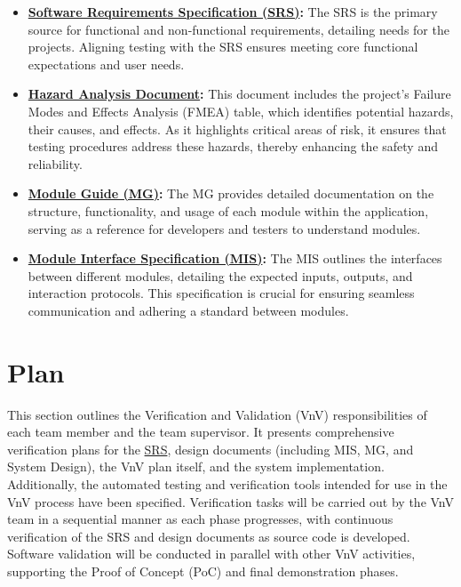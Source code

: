 \documentclass[12pt, titlepage]{article}
\begin{document}
\begin{itemize}
    \item
    \textbf{\href{https://github.com/SumanyaG/Alkalytics/blob/f856af96669275cc29428a8f2cd4b863e4523ff6/docs/SRS/SRS.pdf}{Software
    Requirements Specification (SRS)}:} The SRS is the primary source for
    functional and non-functional requirements, detailing needs for the
    projects. Aligning testing with the SRS ensures meeting core functional
    expectations and user needs.
    
    \item
    \textbf{\href{https://github.com/SumanyaG/Alkalytics/blob/main/docs/HazardAnalysis/HazardAnalysis.pdf}{Hazard
    Analysis Document}:} This document includes the project’s Failure Modes and
    Effects Analysis (FMEA) table, which identifies potential hazards, their
    causes, and effects. As it highlights critical areas of risk, it ensures
    that testing procedures address these hazards, thereby enhancing the safety
    and reliability.

    \item
    \textbf{\href{https://github.com/SumanyaG/Alkalytics/blob/main/docs/Design/SoftArchitecture/MG.pdf}{Module
    Guide (MG)}:} The MG provides detailed documentation on the structure,
    functionality, and usage of each module within the application, serving as a
    reference for developers and testers to understand modules.

    \item
    \textbf{\href{https://github.com/SumanyaG/Alkalytics/blob/main/docs/Design/SoftDetailedDes/MIS.pdf}{Module
    Interface Specification (MIS)}:} The MIS outlines the interfaces between
    different modules, detailing the expected inputs, outputs, and interaction
    protocols. This specification is crucial for ensuring seamless communication
    and adhering a standard between modules.
\end{itemize}



\section{Plan}
This section outlines the Verification and Validation (VnV) responsibilities of
each team member and the team supervisor. It presents comprehensive verification
plans for the
\href{https://github.com/SumanyaG/Alkalytics/blob/f856af96669275cc29428a8f2cd4b863e4523ff6/docs/SRS/SRS.pdf}{SRS},
design documents (including MIS, MG, and System Design), the VnV plan itself,
and the system implementation.\\
\newline Additionally, the automated testing and verification tools intended for
use in the VnV process have been specified. Verification tasks will be carried
out by the VnV team in a sequential manner as each phase progresses, with
continuous verification of the SRS and design documents as source code is
developed. Software validation will be conducted in parallel with other VnV
activities, supporting the Proof of Concept (PoC) and final demonstration
phases.
\end{document}
